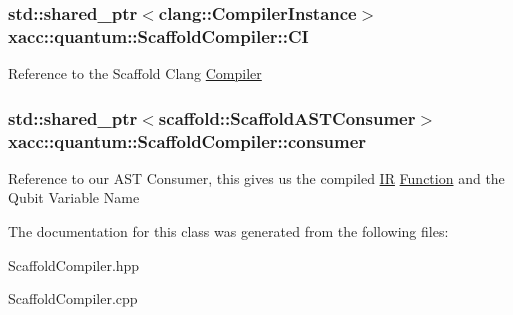 \subsubsection[{\texorpdfstring{CI}{CI}}]{\setlength{\rightskip}{0pt plus 5cm}std\+::shared\+\_\+ptr$<$clang\+::\+Compiler\+Instance$>$ xacc\+::quantum\+::\+Scaffold\+Compiler\+::\+CI\hspace{0.3cm}{\ttfamily [protected]}}\hypertarget{a00065_af7a3a73eaab025a0ea72cc9335d8fbb4}{}\label{a00065_af7a3a73eaab025a0ea72cc9335d8fbb4}
Reference to the Scaffold Clang \hyperlink{a00020}{Compiler} 
\subsubsection[{\texorpdfstring{consumer}{consumer}}]{\setlength{\rightskip}{0pt plus 5cm}std\+::shared\+\_\+ptr$<${\bf scaffold\+::\+Scaffold\+A\+S\+T\+Consumer}$>$ xacc\+::quantum\+::\+Scaffold\+Compiler\+::consumer\hspace{0.3cm}{\ttfamily [protected]}}\hypertarget{a00065_a74f86a2074ec8bd5eeea3ad992433091}{}\label{a00065_a74f86a2074ec8bd5eeea3ad992433091}
Reference to our A\+ST Consumer, this gives us the compiled \hyperlink{a00041}{IR} \hyperlink{a00030}{Function} and the Qubit Variable Name 

The documentation for this class was generated from the following files\+:\begin{DoxyCompactItemize}
\item 
Scaffold\+Compiler.\+hpp\item 
Scaffold\+Compiler.\+cpp\end{DoxyCompactItemize}
